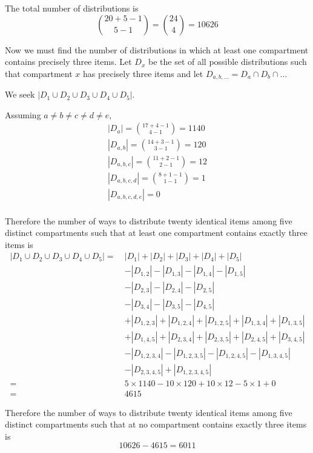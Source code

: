 \documentclass[fleqn]{article}
\newenvironment{answers}{ %
	\begin{enumerate}
		\setlength{\itemsep}{\bigskipamount}
}{\end{enumerate}}
\begin{document}
\begin{answers}
\begin{enumerate}
		The total number of distributions is
		\[\binom{20+5-1}{5-1} = \binom{24}{4} = 10626\]

		Now we must find the number of distributions in which at least one compartment contains precisely three items. Let \(D_x\) be the set of all possible distributions such that compartment \(x\) has precisely three items and let \(D_{a,b,\dots} = D_a \cap D_b \cap \dots\)

		We seek \(|D_1 \cup D_2 \cup D_3 \cup D_4 \cup D_5|\).

		Assuming \(a \neq b \neq c \neq d \neq e\),
		\begin{gather*}
			|D_a| = \binom{17+4-1}{4-1} = 1140 \\
			|D_{a,b}| = \binom{14+3-1}{3-1} = 120 \\
			|D_{a,b,c}| = \binom{11+2-1}{2-1} = 12 \\
			|D_{a,b,c,d}| = \binom{8+1-1}{1-1} = 1 \\
			|D_{a,b,c,d,e}| = 0 \\
		\end{gather*}

		Therefore the number of ways to distribute twenty identical items among five distinct compartments such that at least one compartment contains exactly three items is
		\begin{align*}
			|D_1 \cup D_2 \cup D_3 \cup D_4 \cup D_5| =\ &|D_1| + |D_2| + |D_3| + |D_4| + |D_5| \\
			&- |D_{1,2}| - |D_{1,3}| - |D_{1,4}| - |D_{1,5}| \\
			&- |D_{2,3}| - |D_{2,4}| - |D_{2,5}| \\
			&- |D_{3,4}| - |D_{3,5}| - |D_{4,5}| \\
			&+ |D_{1,2,3}| + |D_{1,2,4}| + |D_{1,2,5}| + |D_{1,3,4}| + |D_{1,3,5}| \\
			&+ |D_{1,4,5}| + |D_{2,3,4}| + |D_{2,3,5}| + |D_{2,4,5}| + |D_{3,4,5}| \\
			&- |D_{1,2,3,4}| - |D_{1,2,3,5}| - |D_{1,2,4,5}| - |D_{1,3,4,5}|  \\
			&- |D_{2,3,4,5}| + |D_{1,2,3,4,5}| \\
			=\ &5 \times 1140 - 10 \times 120 + 10 \times 12 - 5 \times 1 + 0 \\
			=\ &4615
		\end{align*}

		Therefore the number of ways to distribute twenty identical items among five distinct compartments such that at no compartment contains exactly three items is
		\[10626 - 4615 = 6011\]
	\end{enumerate}
\end{answers}
\end{document}

